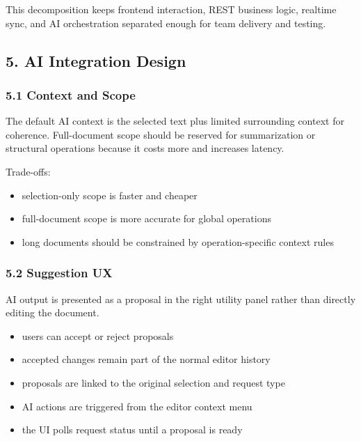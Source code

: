\documentclass[a4paper]{article}
\providecommand{\tightlist}{%
  \setlength{\itemsep}{0pt}\setlength{\parskip}{0pt}}
\begin{document}
This decomposition keeps frontend interaction, REST business logic,
realtime sync, and AI orchestration separated enough for team delivery
and testing.

\subsection{5. AI Integration Design}\label{5-ai-integration-design}

\subsubsection{5.1 Context and Scope}\label{51-context-and-scope}

The default AI context is the selected text plus limited surrounding
context for coherence. Full-document scope should be reserved for
summarization or structural operations because it costs more and
increases latency.

Trade-offs:

\begin{itemize}
\tightlist
\item
  selection-only scope is faster and cheaper
\item
  full-document scope is more accurate for global operations
\item
  long documents should be constrained by operation-specific context
  rules
\end{itemize}

\subsubsection{5.2 Suggestion UX}\label{52-suggestion-ux}

AI output is presented as a proposal in the right utility panel rather
than directly editing the document.

\begin{itemize}
\tightlist
\item
  users can accept or reject proposals
\item
  accepted changes remain part of the normal editor history
\item
  proposals are linked to the original selection and request type
\item
  AI actions are triggered from the editor context menu
\item
  the UI polls request status until a proposal is ready
\end{itemize}
\end{document}
